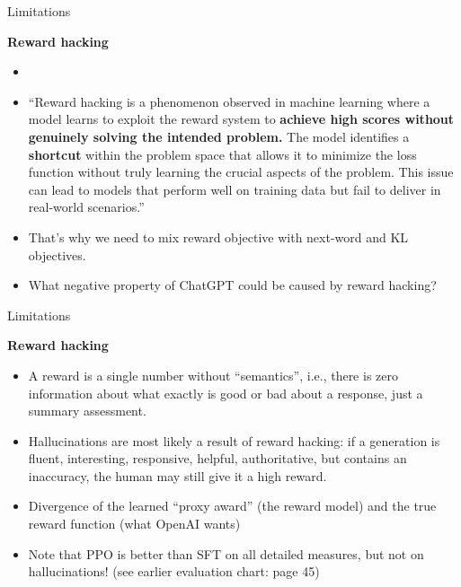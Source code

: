 \begin{vbframe}{Limitations}

\vfill

\textbf{Reward hacking}

	\begin{itemize}
		\item \href{https://medium.com/@prdeepak.babu/reward-hacking-in-large-language-models-llms-c57abbc0cde7}{}
		\item
``Reward hacking is a phenomenon observed in machine
		learning where a model learns to exploit the
		reward system to \textbf{achieve high scores without
		genuinely solving the intended problem.} The
		model identifies a \textbf{shortcut} within the
		problem space that allows it to minimize the
		loss function without truly learning the
		crucial aspects of the problem. This issue
		can lead to models that perform well on
		training data but fail to deliver in
		real-world scenarios.''
                \item That's why we need to mix reward
		objective with next-word and KL objectives.
\item \ques What negative property of ChatGPT
		could be caused by reward hacking?

	\end{itemize}

\vfill

\end{vbframe}

\begin{vbframe}{Limitations}

\vfill

\textbf{Reward hacking}

	\begin{itemize}
		\item
                A reward is a single number without
		``semantics'', i.e., there is zero
		information about what exactly is good or
		bad about a response, just a summary
		assessment.
                
\item Hallucinations are most likely a result of reward
		hacking: if a generation is fluent,
	interesting, responsive, helpful, authoritative, but
	contains an inaccuracy, the human may still give it a
	high reward.
        \item Divergence of the learned ``proxy award'' (the
	reward model) and the true reward function (what
	OpenAI wants)
        \item Note that PPO is better than SFT on all
	detailed measures, but not on hallucinations! (see
	earlier evaluation chart: page 45)
	\end{itemize}

\vfill

\end{vbframe}


